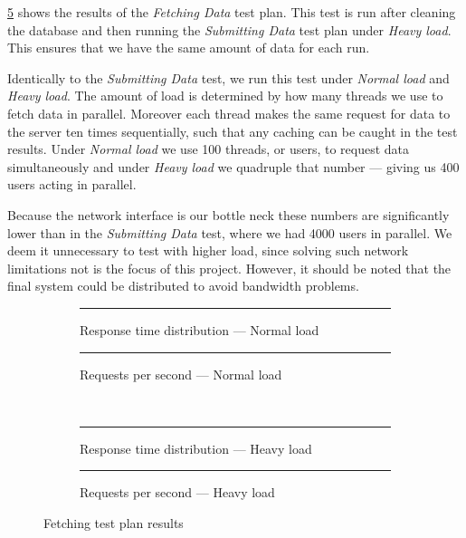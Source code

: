 \bigskip
\cref{fig:fetch_test_results} shows the results of the \textit{Fetching Data} test plan.
This test is run after cleaning the database and then running the \textit{Submitting Data} test plan under \textit{Heavy load}.
This ensures that we have the same amount of data for each run.

Identically to the \textit{Submitting Data} test, we run this test under \textit{Normal load} and \textit{Heavy load}.
The amount of load is determined by how many threads we use to fetch data in parallel.
Moreover each thread makes the same request for data to the server ten times sequentially, such that any caching can be caught in the test results.
Under \textit{Normal load} we use 100 threads, or users, to request data simultaneously and under \textit{Heavy load} we quadruple that number --- giving us 400 users acting in parallel.

Because the network interface is our bottle neck these numbers are significantly lower than in the \textit{Submitting Data} test, where we had 4000 users in parallel.
We deem it unnecessary to test with higher load, since solving such network limitations not is the focus of this project.
However, it should be noted that the final system could be distributed to avoid bandwidth problems.

\begin{figure}[!htb]
    \centering
    \begin{subfigure}[b]{0.5\textwidth}
        \centering
        \rule{5cm}{5cm}
        \caption{Response time distribution --- Normal load}\label{fig:fetch_resp_t_dist}
    \end{subfigure}\hfill%
    \begin{subfigure}[b]{0.5\textwidth}
        \centering
        \rule{5cm}{5cm}
        \caption{Requests per second --- Normal load}\label{fig:fetch_reqs_p_sec}
    \end{subfigure}\\
    \begin{subfigure}[b]{0.5\textwidth}
        \centering
        \rule{5cm}{5cm}
        \caption{Response time distribution --- Heavy load}\label{fig:fetch_resp_t_dist_heavy}
    \end{subfigure}\hfill%
    \begin{subfigure}[b]{0.5\textwidth}
        \centering
        \rule{5cm}{5cm}
        \caption{Requests per second --- Heavy load}\label{fig:fetch_reqs_p_sec_heavy}
    \end{subfigure}
    \caption{Fetching test plan results}\label{fig:fetch_test_results}
\end{figure}

